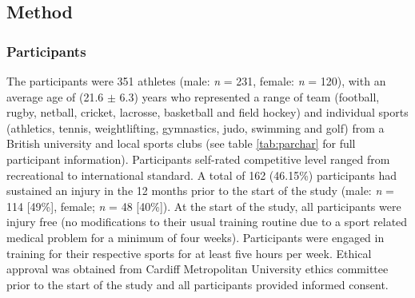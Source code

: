 \documentclass[man,floatsintext]{apa6}
\begin{document}
\newpage

\hypertarget{method}{%
\subsection{Method}\label{method}}

\hypertarget{participants-1}{%
\subsubsection{Participants}\label{participants-1}}

The participants were 351 athletes (male: \emph{n} = 231, female: \emph{n} = 120), with an average age of (21.6 \(\pm\) 6.3) years who represented a range of team (football, rugby, netball, cricket, lacrosse, basketball and field hockey) and individual sports (athletics, tennis, weightlifting, gymnastics, judo, swimming and golf) from a British university and local sports clubs (see table \ref{tab:parchar} for full participant information).
Participants self-rated competitive level ranged from recreational to international standard.
A total of 162 (46.15\%) participants had sustained an injury in the 12 months prior to the start of the study (male: \emph{n} = 114 {[}49\%{]}, female; \emph{n} = 48 {[}40\%{]}).
At the start of the study, all participants were injury free (no modifications to their usual training routine due to a sport related medical problem for a minimum of four weeks).
Participants were engaged in training for their respective sports for at least five hours per week.
Ethical approval was obtained from Cardiff Metropolitan University ethics committee prior to the start of the study and all participants provided informed consent.
\end{document}
